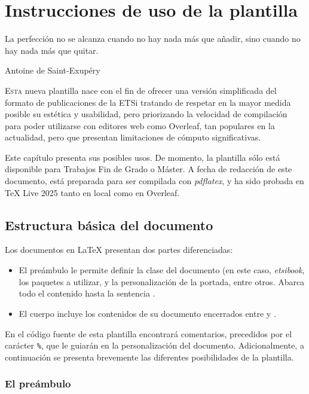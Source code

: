 \chapter{Instrucciones de uso de la plantilla}

\epigraph{La perfección no se alcanza cuando no hay nada más que añadir, sino cuando no hay nada más que quitar.}{Antoine de Saint-Exupéry}

\lettrine[lraise=-0.1, lines=2, loversize=0.2]{E}{sta} nueva plantilla nace con el fin de ofrecer una versión simplificada del formato de publicaciones de la ETSi tratando de respetar en la mayor medida posible su estética y usabilidad, pero priorizando la velocidad de compilación para poder utilizarse con editores web como Overleaf, tan populares en la actualidad, pero que presentan limitaciones de cómputo significativas.

Este capítulo presenta sus posibles usos. De momento, la plantilla sólo está disponible para Trabajos Fin de Grado o Máster. 
A fecha de redacción de este documento, está preparada para ser compilada con \textit{pdflatex}, y ha sido probada en TeX Live 2025 tanto en local como en Overleaf.

\section{Estructura básica del documento}

Los documentos en \LaTeX{} presentan dos partes diferenciadas: 
\begin{itemize}\itemsep 0em
    \item El preámbulo le permite definir la clase del documento (en este caso, \textit{etsibook}, los paquetes a utilizar, y la personalización de la portada, entre otros. Abarca todo el contenido hasta la sentencia \lstinline||.
    \item El cuerpo incluye los contenidos de su documento encerrados entre \lstinline|| y \lstinline||.
\end{itemize}

En el código fuente de esta plantilla encontrará comentarios, precedidos por el carácter \lstinline|%|, que le guiarán en la personalización del documento. Adicionalmente, a continuación se presenta brevemente las diferentes posibilidades de la plantilla.

\subsection{El preámbulo}

